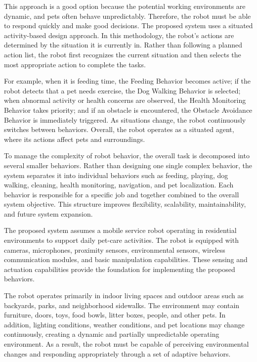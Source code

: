 \documentclass[conference,letterpaper]{IEEEtran}
\begin{document}
This approach is a good option because the potential working environments are dynamic, and pets often behave unpredictably. Therefore, the robot must be able to respond quickly and make good decisions. The proposed system uses a situated activity-based design approach. In this methodology, the robot's actions are determined by the situation it is currently in. Rather than following a planned action list, the robot first recognizes the current situation and then selects the most appropriate action to complete the tasks.

For example, when it is feeding time, the Feeding Behavior becomes active; if the robot detects that a pet needs exercise, the Dog Walking Behavior is selected; when abnormal activity or health concerns are observed, the Health Monitoring Behavior takes priority; and if an obstacle is encountered, the Obstacle Avoidance Behavior is immediately triggered. As situations change, the robot continuously switches between behaviors. Overall, the robot operates as a situated agent, where its actions affect pets and surroundings.

To manage the complexity of robot behavior, the overall task is decomposed into several smaller behaviors. Rather than designing one single complex behavior, the system separates it into individual behaviors such as feeding, playing, dog walking, cleaning, health monitoring, navigation, and pet localization. Each behavior is responsible for a specific job and together combined to the overall system objective. This structure improves flexibility, scalability, maintainability, and future system expansion.

The proposed system assumes a mobile service robot operating in residential environments to support daily pet-care activities. The robot is equipped with cameras, microphones, proximity sensors, environmental sensors, wireless communication modules, and basic manipulation capabilities. These sensing and actuation capabilities provide the foundation for implementing the proposed behaviors.

The robot operates primarily in indoor living spaces and outdoor areas such as backyards, parks, and neighborhood sidewalks. The environment may contain furniture, doors, toys, food bowls, litter boxes, people, and other pets. In addition, lighting conditions, weather conditions, and pet locations may change continuously, creating a dynamic and partially unpredictable operating environment. As a result, the robot must be capable of perceiving environmental changes and responding appropriately through a set of adaptive behaviors.
\end{document}
